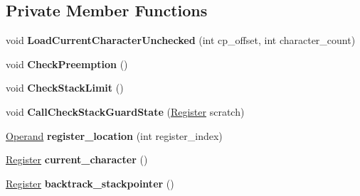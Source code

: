\subsection*{Private Member Functions}
\begin{DoxyCompactItemize}
\item 
void {\bfseries Load\+Current\+Character\+Unchecked} (int cp\+\_\+offset, int character\+\_\+count)\hypertarget{classv8_1_1internal_1_1_reg_exp_macro_assembler_x87_a144cfd104e048ffe869ada716517c429}{}\label{classv8_1_1internal_1_1_reg_exp_macro_assembler_x87_a144cfd104e048ffe869ada716517c429}

\item 
void {\bfseries Check\+Preemption} ()\hypertarget{classv8_1_1internal_1_1_reg_exp_macro_assembler_x87_a17e04a9c80267c04f38f67fa50965290}{}\label{classv8_1_1internal_1_1_reg_exp_macro_assembler_x87_a17e04a9c80267c04f38f67fa50965290}

\item 
void {\bfseries Check\+Stack\+Limit} ()\hypertarget{classv8_1_1internal_1_1_reg_exp_macro_assembler_x87_a8ab2e0a63a0702f5b9fc1d57590c69a8}{}\label{classv8_1_1internal_1_1_reg_exp_macro_assembler_x87_a8ab2e0a63a0702f5b9fc1d57590c69a8}

\item 
void {\bfseries Call\+Check\+Stack\+Guard\+State} (\hyperlink{structv8_1_1internal_1_1_register}{Register} scratch)\hypertarget{classv8_1_1internal_1_1_reg_exp_macro_assembler_x87_a226448ad36570c5e590a7d3d95023684}{}\label{classv8_1_1internal_1_1_reg_exp_macro_assembler_x87_a226448ad36570c5e590a7d3d95023684}

\item 
\hyperlink{classv8_1_1internal_1_1_operand}{Operand} {\bfseries register\+\_\+location} (int register\+\_\+index)\hypertarget{classv8_1_1internal_1_1_reg_exp_macro_assembler_x87_adc8e8a2de8611a88b3eebc540c16717a}{}\label{classv8_1_1internal_1_1_reg_exp_macro_assembler_x87_adc8e8a2de8611a88b3eebc540c16717a}

\item 
\hyperlink{structv8_1_1internal_1_1_register}{Register} {\bfseries current\+\_\+character} ()\hypertarget{classv8_1_1internal_1_1_reg_exp_macro_assembler_x87_a3f90a6a7eddc4b1a1b10e89726ca0fa6}{}\label{classv8_1_1internal_1_1_reg_exp_macro_assembler_x87_a3f90a6a7eddc4b1a1b10e89726ca0fa6}

\item 
\hyperlink{structv8_1_1internal_1_1_register}{Register} {\bfseries backtrack\+\_\+stackpointer} ()\hypertarget{classv8_1_1internal_1_1_reg_exp_macro_assembler_x87_a691695c3a33650757b2a3062d6f4edab}{}\label{classv8_1_1internal_1_1_reg_exp_macro_assembler_x87_a691695c3a33650757b2a3062d6f4edab}


\end{DoxyCompactItemize}
